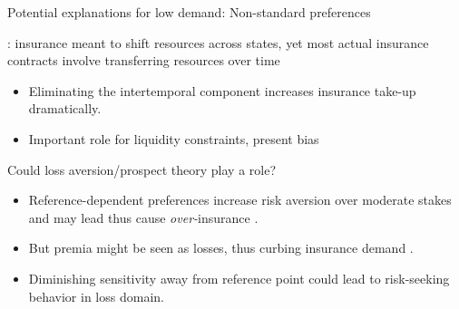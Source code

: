 \documentclass[aspectratio=169, 10pt, handout]{beamer}
\newenvironment{wideitemize}{\itemize\addtolength{\itemsep}{10pt}}{\enditemize}
\begin{document}
\begin{frame}{Potential explanations for low demand: Non-standard preferences}

\begin{wideitemize}

	\item \cite{casaburi2018}: insurance meant to shift resources across states, yet most actual insurance contracts involve transferring resources over time %
	
	\begin{itemize}
	
		\item Eliminating the intertemporal component increases insurance take-up dramatically.
		
		\item Important role for liquidity constraints, present bias

	\end{itemize}
	
	\item Could loss aversion/prospect theory play a role?

	\begin{itemize}

        \item Reference-dependent preferences increase risk aversion over moderate stakes and may lead thus cause \textit{over-}insurance  \citep{sydnor2010over}.

		\item But premia might be seen as losses, thus curbing insurance demand \citep{eckles2011prospect}.
		
		\item Diminishing sensitivity away from reference point could lead to risk-seeking behavior in loss domain. 

	\end{itemize}

\end{wideitemize}

\end{frame}
\end{document}
